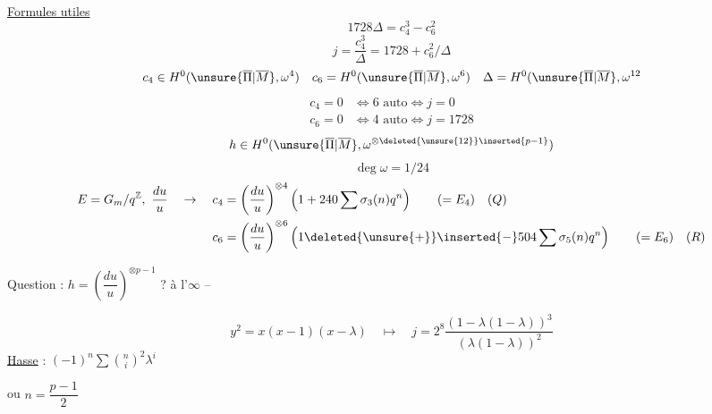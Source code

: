 \uline{Formules utiles}
\[
1728\Delta=c_4^3-c_6^2
\]
\[
j=\frac{c_4^3}{\Delta}=1728+c_6^2/\Delta
\]
\[
c_4\in H^0(\unsure{\overline{\Pi}|\overline{M}},\omega^4)\quad
c_6=H^0(\unsure{\overline{\Pi}|\overline{M}},\omega^6)\quad
\Delta=H^0(\unsure{\overline{\Pi}|\overline{M}},\omega^{12}
\]
\[
\begin{aligned}
c_4=0&\Longleftrightarrow 6\text{ auto}\Longleftrightarrow j=0\\
c_6=0&\Longleftrightarrow 4\text{ auto}\Longleftrightarrow j=1728
\end{aligned}
\]
\[
h\in H^0(\unsure{\overline{\Pi}|\overline{M}},\omega^{\otimes\deleted{\unsure{12}}\inserted{p-1}})
\]
\[
\deg\omega=1/24
\]
\[
\begin{aligned}
E=G_m/q^{\mathbb Z},\ \frac{du}{u}\quad\to\quad
c_4&=\left(\frac{du}{u}\right)^{\otimes4}\left(1+240\sum\sigma_3(n)q^n\right)\qquad(=E_4)\quad(Q)\\
c_6&=\left(\frac{du}{u}\right)^{\otimes6}\left(1\deleted{\unsure{+}}\inserted{-}504\sum\sigma_5(n)q^n\right)\qquad(=E_6)\quad(R)
\end{aligned}
\]

Question : $h=\left(\dfrac{du}{u}\right)^{\otimes p-1}$ ? à l'$\infty$ --

\[
y^2=x(x-1)(x-\lambda)\quad\longmapsto\quad j=2^8\frac{(1-\lambda(1-\lambda))^3}{(\lambda(1-\lambda))^2}
\]
\uline{Hasse} : $(-1)^n\sum\binom{n}{i}^2\lambda^i$

ou $n=\dfrac{p-1}{2}$

